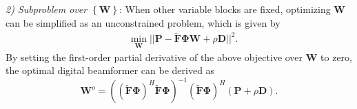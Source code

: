 \documentclass[10pt,journal,twocolumn]{IEEEtran}
\begin{document}
\emph{2) Subproblem over $\left\{\mathbf{W}\right\}$}: When other variable blocks are fixed, optimizing $\mathbf{W}$ can be simplified as an unconstrained problem, which is given by
\begin{align}\label{linear_p14}
&\min_{\mathbf{W} } ||\mathbf{P}-\tilde{\mathbf{F}} \mathbf{\Phi W} +\rho\mathbf{D}||^2.
\end{align}
By setting the first-order partial derivative of the above objective over $\mathbf{W}$ to zero, the optimal digital beamformer can be derived as 
\begin{equation}
\mathbf{W}^o=\left(\left(\tilde{\mathbf{F}} \mathbf{\Phi }\right)^H\tilde{\mathbf{F}} \mathbf{\Phi }\right)^{-1}\left(\tilde{\mathbf{F}} \mathbf{\Phi }\right)^H\left(\mathbf{P}+\rho\mathbf{D}\right).
\label{Optimal_digital_2}
\end{equation} 
\end{document}
